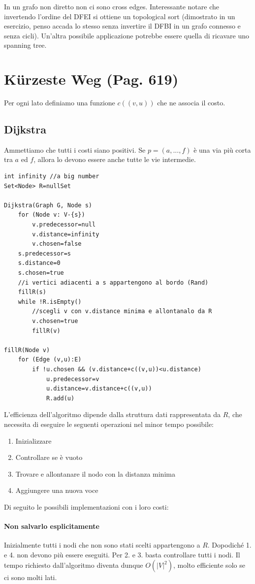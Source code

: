 \documentclass[a4paper]{book}
\newcommand{\lstIndent}{4}
\begin{document}
In un grafo non diretto non ci sono cross edges. Interessante notare che invertendo l'ordine del DFEI si ottiene un topological sort (dimostrato in un esercizio, penso accada lo stesso senza invertire il DFBI in un grafo connesso e senza cicli). Un'altra possibile applicazione potrebbe essere quella di ricavare uno spanning tree. 
\section{Kürzeste Weg (Pag. 619)}
Per ogni lato definiamo una funzione $c((v,u))$ che ne associa il costo.
\subsection{Dijkstra}
Ammettiamo che tutti i costi siano positivi. Se $p=(a,...,f)$ è una via più corta tra $a$ ed $f$, allora lo devono essere anche tutte le vie intermedie.
\begin{lstlisting}[tabsize=\lstIndent]
int infinity //a big number
Set<Node> R=nullSet
	
Dijkstra(Graph G, Node s)
	for (Node v: V-{s})
		v.predecessor=null
		v.distance=infinity
		v.chosen=false	
	s.predecessor=s
	s.distance=0
	s.chosen=true
	//i vertici adiacenti a s appartengono al bordo (Rand)
	fillR(s)
	while !R.isEmpty()
		//scegli v con v.distance minima e allontanalo da R
		v.chosen=true
		fillR(v)
		
fillR(Node v)
	for (Edge (v,u):E)
		if !u.chosen && (v.distance+c((v,u))<u.distance)
			u.predecessor=v
			u.distance=v.distance+c((v,u))
			R.add(u)				
\end{lstlisting}
L'efficienza dell'algoritmo dipende dalla struttura dati rappresentata da $R$, che necessita di eseguire le seguenti operazioni nel minor tempo possibile:
\begin{enumerate}
\item Inizializzare
\item Controllare se è vuoto
\item Trovare e allontanare il nodo con la distanza minima
\item Aggiungere una nuova voce
\end{enumerate}
Di seguito le possibili implementazioni con i loro costi:
\paragraph*{Non salvarlo esplicitamente}
Inizialmente tutti i nodi che non sono stati scelti appartengono a $R$. Dopodiché 1. e 4. non devono più essere eseguiti. Per 2. e 3. basta controllare tutti i nodi. Il tempo richiesto dall'algoritmo diventa dunque $O(|V|^2)$, molto efficiente solo se ci sono molti lati.
\end{document}
